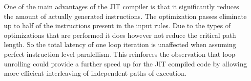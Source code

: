 One of the main advantages of the JIT compiler is that it significantly reduces the amount of actually generated instructions. The optimization passes eliminate up to half of the instructions present in the input rules. Due to the types of optimizations that are performed it does however not reduce the critical path length. So the total latency of one loop iteration is unaffected when assuming perfect instruction level paralellism. This reinforces the observation that loop unrolling could provide a further speed up for the JIT compiled code by allowing more efficient interleaving of independent paths of execution.



